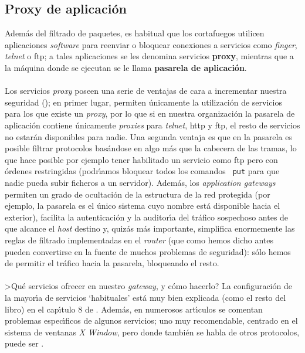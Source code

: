 \subsection{Proxy de aplicaci\'on}
Adem\'as del filtrado de paquetes, es habitual que los cortafuegos utilicen
aplicaciones {\it software} para reenviar o bloquear conexiones a servicios
como {\it finger}, {\it telnet} o {\sc ftp}; a tales aplicaciones se les 
denomina servicios {\bf proxy}, mientras que a la m\'aquina donde se ejecutan
se le llama {\bf pasarela de aplicaci\'on}.\\
\\Los servicios {\it proxy} poseen una serie de ventajas de cara a incrementar
nuestra seguridad (\cite{kn:wack94}); en primer lugar, permiten \'unicamente la 
utilizaci\'on de
servicios para los que existe un {\it proxy}, por lo que si en nuestra 
organizaci\'on la pasarela de aplicaci\'on contiene \'unicamente {\it proxies}
para {\it telnet}, {\sc http} y {\sc ftp}, el resto de servicios no estar\'an
disponibles para nadie. Una segunda ventaja es que en la pasarela es posible
filtrar protocolos bas\'andose en algo m\'as que la cabecera de las tramas, lo
que hace posible por ejemplo tener habilitado un servicio como {\sc ftp} pero
con \'ordenes restringidas (podr\'{\i}amos bloquear todos los comandos {\tt
put} para que nadie pueda subir ficheros a un servidor). Adem\'as, los {\it 
application gateways} permiten un grado de ocultaci\'on de la estructura de
la red protegida (por ejemplo, la pasarela es el \'unico sistema cuyo nombre
est\'a disponible hacia el exterior), facilita la autenticaci\'on y la
auditor\'{\i}a del tr\'afico sospechoso antes de que alcance el {\it host} 
destino y, quiz\'as m\'as importante, simplifica enormemente las reglas de
filtrado implementadas en el {\it router} (que como hemos dicho antes pueden
convertirse en la fuente de muchos problemas de seguridad): s\'olo hemos de
permitir el tr\'afico hacia la pasarela, bloqueando el resto.\\
\\>Qu\'e servicios ofrecer en nuestro {\it gateway}, y c\'omo hacerlo? La 
configuraci\'on de la mayor\'{\i}a de servicios `habituales' est\'a muy bien 
explicada (como el resto del libro) en el cap\'{\i}tulo 8 de \cite{kn:bre95}.
Adem\'as, en numerosos art\'{\i}culos se comentan problemas espec\'{\i}ficos de 
algunos servicios; uno muy recomendable, centrado en el sistema de ventanas 
{\it X Window}, pero donde tambi\'en se habla de otros protocolos, puede ser 
\cite{kn:win93}.\\
